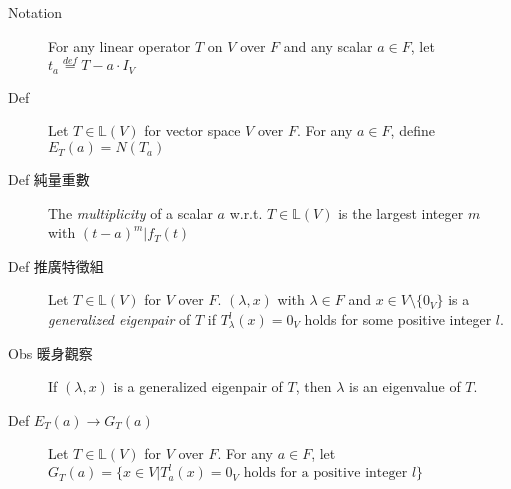 \documentclass[9pt, twocolumn]{extarticle}
\newcommand{\ltrans}{\mathbb{L}}
\begin{document}
\begin{description}
    \item[Notation] For any linear operator $T$ on $V$ over $F$ and any scalar $a \in F$, let $t_a \overset{def}{=} T  - a \cdot I_V$
    \item[Def] Let $T \in \ltrans(V)$ for vector space $V$ over $F$. For any $a \in F$, define $E_T(a) = N(T_a)$
    \item[Def  純量重數] The \emph{multiplicity} of a scalar $a$ w.r.t. $T \in \ltrans(V)$ is the largest integer $m$ with $(t -a)^m | f_T(t)$
    \item[Def 推廣特徵組] Let $T \in \ltrans(V)$ for $V$ over $F$. $(\lambda, x)$ with $\lambda \in F$ and $x \in V \setminus \{0_V\}$ is a \emph{generalized eigenpair} of $T$ if $T_\lambda^l (x) = 0_V$ holds for some positive integer $l$.
    \item[Obs 暖身觀察] If $(\lambda, x)$ is a generalized eigenpair of $T$, then $\lambda$ is an eigenvalue of $T$.
    \item[Def $E_T(a)\rightarrow G_T(a)$] Let $T \in \ltrans (V)$ for $V$ over $F$. For any $a \in F$, let $G_T (a) = \{x \in V | T_a^l (x) = 0_V \text{ holds for a positive integer }l\}$ 


\end{description}
\end{document}
